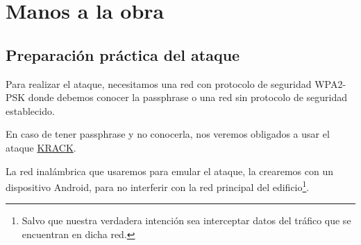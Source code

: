 \chapter{Manos a la obra}
\section{Preparación práctica del ataque} 
Para realizar el ataque, necesitamos una red con protocolo de seguridad WPA2-PSK donde debemos conocer la passphrase o una red sin protocolo de seguridad establecido.

\Nota En caso de tener passphrase y no conocerla, nos veremos obligados a usar el ataque \hyperlink{krack}{KRACK}.


La red inalámbrica que usaremos para emular el ataque, la crearemos con un dispositivo Android, para no interferir con la red principal del edificio\footnote{Salvo que nuestra verdadera intención sea interceptar datos del tráfico que se encuentran en dicha red.}.

